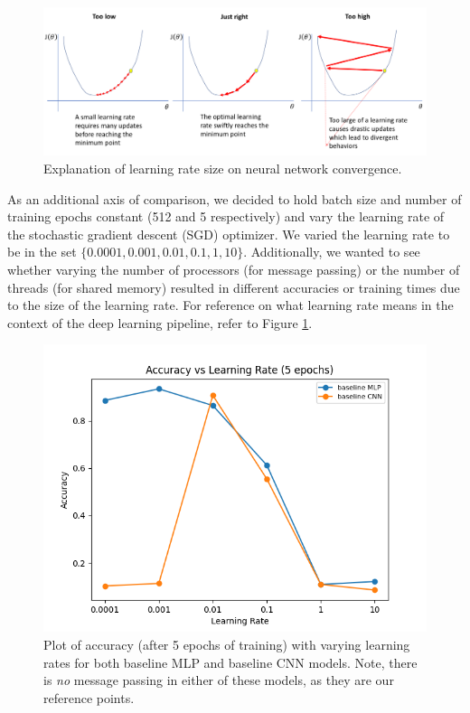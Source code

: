 \documentclass{article}
\begin{document}
\begin{figure}[!h]
    \includegraphics[scale = 0.35]{lr}
    \centering
    \caption{Explanation of learning rate size on neural network convergence.}
    \label{fig:lr}
\end{figure}

As an additional axis of comparison, we decided to hold batch size and number of training epochs constant (512 and 5 respectively) and vary the learning rate of the stochastic gradient descent (SGD) optimizer. We varied the learning rate to be in the set $\{0.0001, 0.001, 0.01, 0.1, 1, 10\}$. Additionally, we wanted to see whether varying the number of processors (for message passing) or the number of threads (for shared memory) resulted in different accuracies or training times due to the size of the learning rate. For reference on what learning rate means in the context of the deep learning pipeline, refer to Figure \ref{fig:lr}.

\begin{figure}[!h]
    \centering
    \includegraphics[scale=0.5]{base_acc}
    \caption{Plot of accuracy (after 5 epochs of training) with varying learning rates for both baseline MLP and baseline CNN models. Note, there is \textit{no} message passing in either of these models, as they are our reference points.}
    \label{fig:base_lr}
\end{figure}
\end{document}
